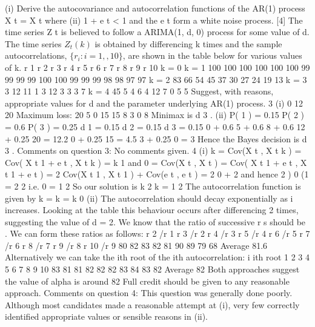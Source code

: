 \documentclass[a4paper,12pt]{article}
\begin{document}
(i)
Derive the autocovariance and autocorrelation functions of the AR(1) process
X t = X t
where
(ii)
1
+ e t
< 1 and the e t form a white noise process.
[4]
The time series Z t is believed to follow a ARIMA(1, d, 0) process for some value of d. The time series $Z_t ( k )$ is obtained by differencing k times and the sample autocorrelations, $\{r_i : i = 1, , 10\}$, are shown in the table below for
various values of k.
r 1
r 2
r 3
r 4
r 5
r 6
r 7
r 8
r 9
r 10
k = 0 k = 1
100%
100%
100%
100%
100%
100%
99%
99%
99%
99%
100%
100%
99%
99%
99%
98%
98%
97%
97%
k = 2
83%
66%
54%
45%
37%
30%
27%
24%
19%
13%
k = 3
3%
12%
11%
1%
3%
12%
3%
3%
3%
7%
k = 4
45%
5%
4%
6%
4%
12%
7%
0%
5%
5%
Suggest, with reasons, appropriate values for d and the parameter
underlying AR(1) process.
3
(i)
0
12
20
Maximum loss: 20
5
0
15
15
8
3
0
8
Minimax is d 3 .
(ii)
P( 1 ) = 0.15
P( 2 ) = 0.6
P( 3 ) = 0.25
d 1 = 0.15
d 2 = 0.15
d 3 = 0.15
0 + 0.6
5 + 0.6
8 + 0.6
12 + 0.25 20 = 12.2
0 + 0.25 15 = 4.5
3 + 0.25 0 = 3
Hence the Bayes decision is d 3 .
Comments on question 3: No comments given.
4
(i)
k
= Cov(X t , X t k )
= Cov( X t 1 + e t , X t k )
= k 1
and
0
= Cov(X t , X t )
= Cov( X t 1 + e t , X t 1 + e t )
= 2 Cov(X t 1 , X t 1 ) + Cov(e t , e t )
= 2 0 + 2
and hence
2 )
0 (1
=
2
2
i.e.
0 =
1
2
So our solution is
k 2
k =
1
2
The autocorrelation function is given by
k
=
k
=
k
0
(ii)
The autocorrelation should decay exponentially as i increases. Looking at the table this behaviour occurs after differencing 2 times, suggesting the value of d = 2.
We know that the ratio of successive r s should be . We can form these
ratios as follows:
r 2 /r 1
r 3 /r 2
r 4 /r 3
r 5 /r 4
r 6 /r 5
r 7 /r 6
r 8 /r 7
r 9 /r 8
r 10 /r 9 80%
82%
83%
82%
81%
90%
89%
79%
68%
Average 81.6%
Alternatively we can take the ith root of the ith autocorrelation:
i ith root
1
2
3
4
5
6
7
8
9
10 83%
81%
81%
82%
82%
82%
83%
84%
83%
82%
Average 82%
Both approaches suggest the value of alpha is around 82%
Full credit should be given to any reasonable approach.
Comments on question 4: This question was generally done poorly. Although most
candidates made a reasonable attempt at (i), very few correctly identified appropriate values
or sensible reasons in (ii).
\end{document}
